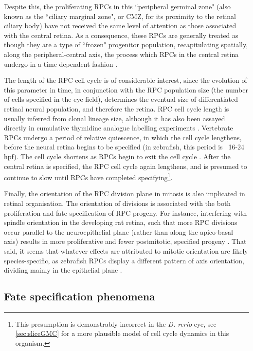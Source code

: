 Despite this, the proliferating RPCs in this ``peripheral germinal zone" (also known as the ``ciliary marginal zone", or CMZ, for its proximity to the retinal ciliary body) have not received the same level of attention as those associated with the central retina. As a consequence, these RPCs are generally treated as though they are a type of ``frozen" progenitor population, recapitulating spatially, along the peripheral-central axis, the process which RPCs in the central retina undergo in a time-dependent fashion \cite{Harris1998}.

The length of the RPC cell cycle is of considerable interest, since the evolution of this parameter in time, in conjunction with the RPC population size (the number of cells specified in the eye field), determines the eventual size of differentiated retinal neural population, and therefore the retina. RPC cell cycle length is usually inferred from clonal lineage size, although it has also been assayed directly in cumulative thymidine analogue labelling experiments \cite{Alexiades1996}. Vertebrate RPCs undergo a period of relative quiescence, in which the cell cycle lengthens, before the neural retina begins to be specified (in zebrafish, this period is ~16-24 hpf). The cell cycle shortens as RPCs begin to exit the cell cycle \cite{Harris1991,Li2000}. After the central retina is specified, the RPC cell cycle again lengthens, and is presumed to continue to slow until RPCs have completed specifying\footnote{This presumption is demonstrably incorrect in the \textit{D. rerio} eye, see \autoref{sec:sliceGMC} for a more plausible model of cell cycle dynamics in this organism.}.

Finally, the orientation of the RPC division plane in mitosis is also  implicated in retinal organisation. The orientation of divisions is associated with the both proliferation and fate specification of RPC progeny. For instance, interfering with spindle orientation in the developing rat retina, such that more RPC divisions occur parallel to the neuroepithelial plane (rather than along the apico-basal axis) results in more proliferative and fewer postmitotic, specified progeny \cite{Zigman2005}. That said, it seems that whatever effects are attributed to mitotic orientation are likely species-specific, as zebrafish RPCs display a different pattern of axis orientation, dividing mainly in the epithelial plane \cite{Das2003}.

\subsection{Fate specification phenomena}

